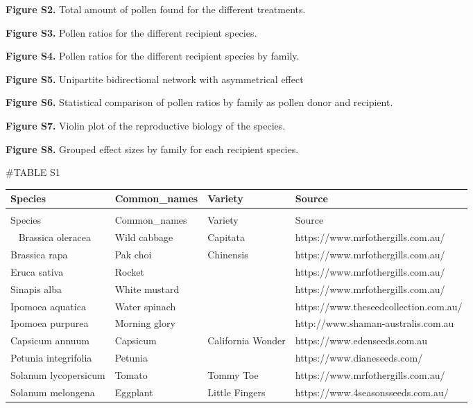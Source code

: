 \documentclass[
  12pt,
]{article}
\begin{document}
\textbf{Figure S2.} Total amount of pollen found for the different
treatments.

\textbf{Figure S3.} Pollen ratios for the different recipient species.

\textbf{Figure S4.} Pollen ratios for the different recipient species by
family.

\textbf{Figure S5.} Unipartite bidirectional network with asymmetrical
effect

\textbf{Figure S6.} Statistical comparison of pollen ratios by family as
pollen donor and recipient.

\textbf{Figure S7.} Violin plot of the reproductive biology of the
species.

\textbf{Figure S8.} Grouped effect sizes by family for each recipient
species.

\newpage

\#TABLE S1 \begingroup\fontsize{7}{9}\selectfont

\begin{longtabu} to 
\toprule
\textbf{Species} & \textbf{Common\_names} & \textbf{Variety} & \textbf{Source}\\
\midrule
\endfirsthead
{}\\
\toprule
Species & Common\_names & Variety & Source\\
\midrule
\endhead
\
\endfoot
\bottomrule
\endlastfoot
{}  Brassica oleracea & Wild cabbage & Capitata & https://www.mrfothergills.com.au/\\
\addlinespace
Brassica rapa & Pak choi & Chinensis & https://www.mrfothergills.com.au/\\
\addlinespace
{}  Eruca sativa & Rocket &  & https://www.mrfothergills.com.au/\\
\addlinespace
Sinapis alba & White mustard &  & https://www.mrfothergills.com.au/\\
\addlinespace
{}  Ipomoea aquatica & Water spinach &  & https://www.theseedcollection.com.au/\\
\addlinespace
Ipomoea purpurea & Morning glory &  & http://www.shaman-australis.com.au\\
\addlinespace
{}  Capsicum annuum & Capsicum & California Wonder & https://www.edenseeds.com.au\\
\addlinespace
Petunia integrifolia & Petunia &  & https://www.dianeseeds.com/\\
\addlinespace
{}  Solanum lycopersicum & Tomato & Tommy Toe & https://www.mrfothergills.com.au/\\
\addlinespace
Solanum melongena & Eggplant & Little Fingers & https://www.4seasonsseeds.com.au/\\*
\end{longtabu}
\endgroup{}
\end{document}
